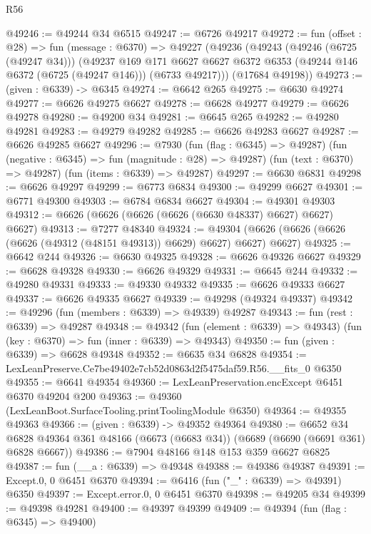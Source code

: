 \begin{lexlean}{R56}
\begin{coremodule}
@49246 := @49244 @34 @6515
@49247 := @6726 @49217
@49272 := fun (offset : @28) =>
  fun (message : @6370) =>
  @49227
    (@49236
      (@49243
        (@49246 (@6725 (@49247 @34)))
        (@49237
          @169
          @171
          @6627
          @6627
          @6372
          @6353
          (@49244 @146 @6372 (@6725 (@49247 @146)))
          (@6733 @49217)))
      (@17684 @49198))
@49273 := (given : @6339) -> @6345
@49274 := @6642 @265
@49275 := @6630 @49274
@49277 := @6626 @49275 @6627
@49278 := @6628 @49277
@49279 := @6626 @49278
@49280 := @49200 @34
@49281 := @6645 @265
@49282 := @49280 @49281
@49283 := @49279 @49282
@49285 := @6626 @49283 @6627
@49287 := @6626 @49285 @6627
@49296 := @7930
    (fun (flag : @6345) => @49287)
    (fun (negative : @6345) => fun (magnitude : @28) => @49287)
    (fun (text : @6370) => @49287)
    (fun (items : @6339) => @49287)
@49297 := @6630 @6831
@49298 := @6626 @49297
@49299 := @6773 @6834
@49300 := @49299 @6627
@49301 := @6771 @49300
@49303 := @6784 @6834 @6627
@49304 := @49301 @49303
@49312 := @6626 (@6626 (@6626 (@6626 (@6630 @48337) @6627) @6627) @6627)
@49313 := @7277 @48340
@49324 := @49304 (@6626 (@6626 (@6626 (@6626 (@49312 (@48151 @49313)) @6629) @6627) @6627) @6627)
@49325 := @6642 @244
@49326 := @6630 @49325
@49328 := @6626 @49326 @6627
@49329 := @6628 @49328
@49330 := @6626 @49329
@49331 := @6645 @244
@49332 := @49280 @49331
@49333 := @49330 @49332
@49335 := @6626 @49333 @6627
@49337 := @6626 @49335 @6627
@49339 := @49298 (@49324 @49337)
@49342 := @49296 (fun (members : @6339) => @49339) @49287
@49343 := fun (rest : @6339) => @49287
@49348 := @49342
    (fun (element : @6339) => @49343)
    (fun (key : @6370) => fun (inner : @6339) => @49343)
@49350 := fun (given : @6339) => @6628 @49348
@49352 := @6635 @34 @6828
@49354 := LexLeanPreserve.Ce7be49402e7cb52d0863d2f5475daf59.R56.__fits_0 @6350
@49355 := @6641 @49354
@49360 := LexLeanPreservation.encExcept @6451 @6370 @49204 @200
@49363 := @49360 (LexLeanBoot.SurfaceTooling.printToolingModule @6350)
@49364 := @49355 @49363
@49366 := (given : @6339) -> @49352 @49364
@49380 := @6652
    @34
    @6828
    @49364
    @361
    @48166
    (@6673 (@6683 @34))
    (@6689 (@6690 (@6691 @361) @6828 @6667))
@49386 := @7904 @48166 @148 @153 @359 @6627 @6825
@49387 := fun (__a : @6339) => @49348
@49388 := @49386 @49387
@49391 := Except.{0, 0} @6451 @6370
@49394 := @6416 (fun ("_" : @6339) => @49391) @6350
@49397 := Except.error.{0, 0} @6451 @6370
@49398 := @49205 @34
@49399 := @49398 @49281
@49400 := @49397 @49399
@49409 := @49394
    (fun (flag : @6345) => @49400)

\end{coremodule}
\end{lexlean}
